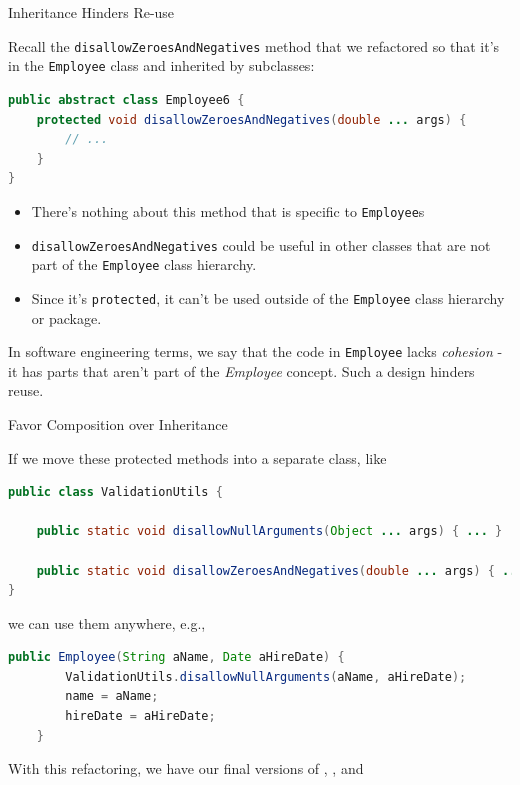 \documentclass{beamer}
\begin{document}
\begin{frame}[fragile]{Inheritance Hinders Re-use}

Recall the {\tt disallowZeroesAndNegatives} method that we refactored so that it's in the {\tt Employee} class and inherited by subclasses:
\vspace{-.05in}
\begin{lstlisting}[language=Java]
public abstract class Employee6 {
    protected void disallowZeroesAndNegatives(double ... args) {
        // ...
    }
}
\end{lstlisting}

\begin{itemize}
\item There's nothing about this method that is specific to {\tt Employee}s
\item {\tt disallowZeroesAndNegatives} could be useful in other classes that are not part of the {\tt Employee} class hierarchy.
\item Since it's {\tt protected}, it can't be used outside of the {\tt Employee} class hierarchy or package.
\end{itemize}

In software engineering terms, we say that the code in {\tt Employee} lacks {\it cohesion} - it has parts that aren't part of the {\it Employee} concept.  Such a design hinders reuse.

\end{frame}

\begin{frame}[fragile]{Favor Composition over Inheritance}

If we move these protected methods into a separate class, like 
\begin{lstlisting}[language=Java]
public class ValidationUtils {

    public static void disallowNullArguments(Object ... args) { ... }

    public static void disallowZeroesAndNegatives(double ... args) { ... }
}
\end{lstlisting}
we can use them anywhere, e.g.,
\begin{lstlisting}[language=Java]
    public Employee(String aName, Date aHireDate) {
        ValidationUtils.disallowNullArguments(aName, aHireDate);
        name = aName;
        hireDate = aHireDate;
    }
\end{lstlisting}
With this refactoring, we have our final versions of ,
, and

\end{frame}
\end{document}
